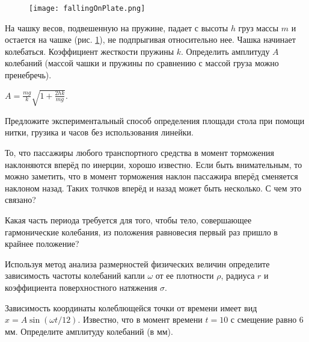 \begin{figure}[h]
\centering
\texttt{[image: fallingOnPlate.png]}
\caption{}
\label{fallingOnPlate}
\end{figure}

\begin{ex} %
На чашку весов, подвешенную на пружине, падает с высоты $h$ груз массы $m$ и остается на чашке (рис. \ref{fallingOnPlate}), не подпрыгивая относительно нее. Чашка начинает колебаться. Коэффициент жесткости пружины $k$. Определить амплитуду $A$ колебаний (массой чашки и пружины по сравнению с массой груза можно пренебречь).
\begin{ans}
$A = \frac{mg}{k}\sqrt{ 1 + \frac{2hk}{mg}}$.
\end{ans}
\end{ex}	

\qualProblems

\begin{ex}
Предложите экспериментальный способ определения площади стола при помощи нитки, грузика и часов без использования линейки.
\end{ex}	

\begin{ex}
То, что пассажиры любого транспортного средства в момент торможения наклоняются вперёд по инерции, хорошо известно. Если быть внимательным, то можно заметить, что в момент торможения наклон пассажира вперёд сменяется наклоном назад. Таких толчков вперёд и назад может быть несколько. С чем это связано?
\end{ex}	

\begin{ex}
Какая часть периода требуется для того, чтобы тело, совершающее гармонические колебания, из положения равновесия первый раз пришло в крайнее положение?
\end{ex}	

\begin{ex}
Используя метод анализа размерностей физических величин определите зависимость частоты колебаний капли $\omega$ от ее плотности $\rho$, радиуса $r$ и коэффициента поверхностного натяжения $\sigma$.
\end{ex}	

\simpleProblems

\begin{ex}
Зависимость координаты колеблющейся точки от времени имеет вид $x = A\sin(\omega t/12)$. Известно, что в момент времени $t = 10$ с смещение равно 6 мм. Определите амплитуду колебаний (в мм).
\end{ex}	

